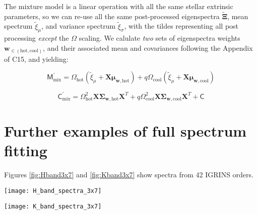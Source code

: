 \documentclass[twocolumn]{emulateapj}%
\newcommand{\iancze}{{\sc C15}}
\begin{document}
The mixture model is a linear operation with all the same stellar extrinsic parameters, so we can re-use all the same post-processed eigenspectra $\widetilde{\mathbf{\Xi}}$, mean spectrum $\widetilde{\xi}_\mu$, and variance spectrum $\widetilde{\xi}_\sigma$, with the tildes representing all post processing \emph{except} the $\Omega$ scaling.  We calulate \emph{two} sets of eigenspectra weights $\mathbf{w}_{\in (\mathrm{hot}, \mathrm{cool})}$, and their associated mean and covariances following the Appendix of \iancze, and yielding:

\begin{equation}
  \mathsf{M}_{\mathrm{mix}}^\prime = \Omega_{\mathrm{hot}} (\widetilde{\xi}_\mu + \mathbf{X} \mathbf{\mu}_{\mathbf{w}, \mathrm{hot}}) + q \Omega_{\mathrm{cool}} (\widetilde{\xi}_\mu + \mathbf{X} \mathbf{\mu}_{\mathbf{w}, \mathrm{cool}})
\end{equation}

\begin{equation}
  \mathsf{C}_{\mathrm{mix}}^\prime = \Omega_{\mathrm{hot}}^2 \mathbf{X} \mathbf{\Sigma}_\mathbf{w, \mathrm{hot}} \mathbf{X}^T + q \Omega_{\mathrm{cool}}^2 \mathbf{X} \mathbf{\Sigma}_\mathbf{w, \mathrm{cool}} \mathbf{X}^T + \mathsf{C}
  \label{eqn:modC}
\end{equation}



\section{Further examples of full spectrum fitting}

Figures \ref{fig:Hband3x7} and \ref{fig:Kband3x7} show spectra from 42 IGRINS orders.


\begin{figure*}
 \centering
 \texttt{[image: H\_band\_spectra\_3x7]}
 \caption{IGRINS Orders $122-100$, with panels arranged with the shortest wavelength in the upper left corner with central wavelenth decreasing toward the bottom of the leftmost column, then decreasing through the subsequent columns.  The $y-$axis is on a logarithmic scale.  The red line is the cool photosphere while the blue line is the hot photosphere.  The purple line is the composite mixture model.}
 \label{fig:Hband3x7}
\end{figure*}

\begin{figure*}
 \centering
 \texttt{[image: K\_band\_spectra\_3x7]}
 \caption{IGRINS Orders $93-73$, with the same layout, ordering, and colors as Figure \ref{fig:Hband3x7}. The $y-$axis is on a logarithmic scale.}
 \label{fig:Kband3x7}
\end{figure*}
\end{document}
